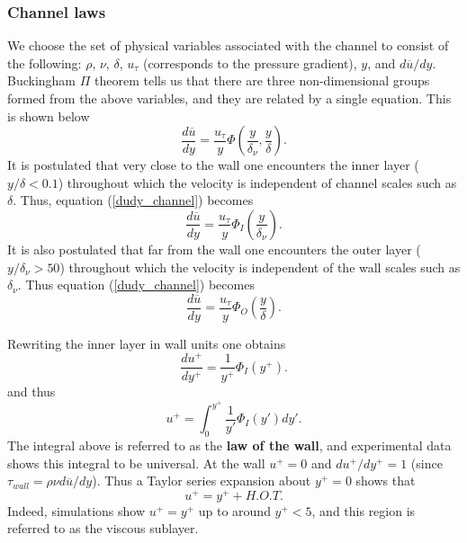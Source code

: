 \documentclass[oneside,a4paper,11pt]{report}
\newcommand{\uavg}{\overline{u}}
\begin{document}
\subsubsection{Channel laws}

We choose the set of physical variables associated with the channel to consist of the following: $\rho$, $\nu$, $\delta$, $u_{\tau}$ (corresponds to the pressure gradient), $y$, and $d \uavg/dy$. Buckingham $\Pi$ theorem tells us that there are three non-dimensional groups formed from the above variables, and they are related by a single equation. This is shown below
\begin{equation}
\label{dudy_channel}
\frac{d\uavg}{dy} = \frac{u_\tau}{y} \Phi \left ( \frac{y}{\delta_\nu}, \frac{y}{\delta} \right ).
\end{equation}
It is postulated that very close to the wall one encounters the inner layer ($y/\delta < 0.1$) throughout which the velocity is independent of channel scales such as $\delta$. Thus, equation (\ref{dudy_channel}) becomes
\begin{equation}
\label{inner_layer}
\frac{d\uavg}{dy} = \frac{u_\tau}{y} \Phi_I \left ( \frac{y}{\delta_\nu} \right ).
\end{equation}
It is also postulated that far from the wall one encounters the outer layer ($y/\delta_\nu > 50$) throughout which the velocity is independent of the wall scales such as $\delta_\nu$. Thus equation (\ref{dudy_channel}) becomes 
\begin{equation}
\label{outer_layer}
\frac{d\uavg}{dy} = \frac{u_\tau}{y} \Phi_O \left (\frac{y}{\delta} \right ).
\end{equation}

Rewriting the inner layer in wall units one obtains
\begin{equation}
\frac{d u^+}{dy^+} = \frac{1}{y^+} \Phi_I ( y^+ ).
\end{equation}
and thus
\begin{equation}
\label{law_wall}
u^+ = \int_0^{y^+} \frac{1}{y'} \Phi_I (y') dy'.
\end{equation}
The integral above is referred to as the \textbf{law of the wall}, and experimental data shows this integral to be universal. At the wall $u^+=0$ and $du^+/dy^+ = 1$ (since $\tau_{wall} = \rho \nu d\uavg/dy$). Thus a Taylor series expansion about $y^+=0$ shows that
\begin{equation}
u^+ = y^+ + H.O.T.
\end{equation}
Indeed, simulations show $u^+=y^+$ up to around $y^+ < 5$, and this region is referred to as the viscous sublayer.
\end{document}
